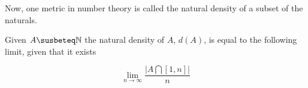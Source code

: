 \documentclass[paper=a4,fontsize=paper,12.5pt]{book}
\newcommand{\3}{\vspace*{3mm}}
\newcommand{\N}{\mathbb{N}}
\begin{document}
Now, one metric in number theory is called the natural density of a subset of the naturals.

\begin{definition}

Given $A \susbeteq \N$ the natural density of $A$, $d(A)$, is equal to the following limit, given that it exists 

\[ \lim_{n \to \infty} \frac{\vert A \bigcap [1,n] \vert}{n} \]

\end{definition}
\end{document}
